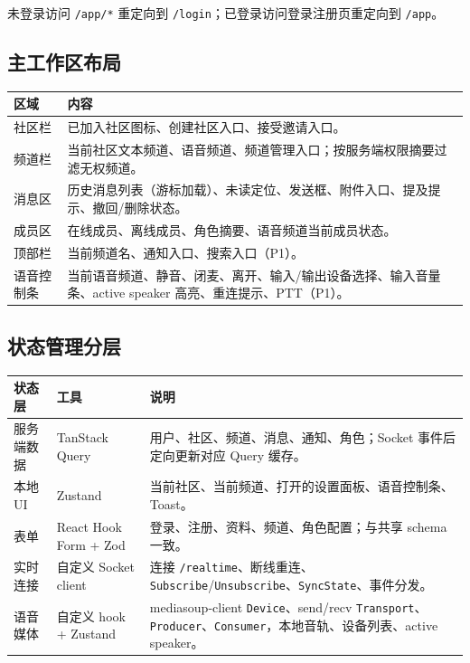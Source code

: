 未登录访问 \texttt{/app/*} 重定向到 \texttt{/login}；已登录访问登录注册页重定向到 \texttt{/app}。

\subsection{主工作区布局}

\noindent\begin{tabularx}{\textwidth}{L{2.8cm}Y}
  \toprule
  区域 & 内容 \\
  \midrule
  社区栏 & 已加入社区图标、创建社区入口、接受邀请入口。 \\
  频道栏 & 当前社区文本频道、语音频道、频道管理入口；按服务端权限摘要过滤无权频道。 \\
  消息区 & 历史消息列表（游标加载）、未读定位、发送框、附件入口、提及提示、撤回/删除状态。 \\
  成员区 & 在线成员、离线成员、角色摘要、语音频道当前成员状态。 \\
  顶部栏 & 当前频道名、通知入口、搜索入口（P1）。 \\
  语音控制条 & 当前语音频道、静音、闭麦、离开、输入/输出设备选择、输入音量条、active speaker 高亮、重连提示、PTT（P1）。 \\
  \bottomrule
\end{tabularx}

\subsection{状态管理分层}

\noindent\begin{tabularx}{\textwidth}{L{3.4cm}L{3cm}Y}
  \toprule
  状态层 & 工具 & 说明 \\
  \midrule
  服务端数据 & TanStack Query & 用户、社区、频道、消息、通知、角色；Socket 事件后定向更新对应 Query 缓存。 \\
  本地 UI & Zustand & 当前社区、当前频道、打开的设置面板、语音控制条、Toast。 \\
  表单 & React Hook Form + Zod & 登录、注册、资料、频道、角色配置；与共享 schema 一致。 \\
  实时连接 & 自定义 Socket client & 连接 \texttt{/realtime}、断线重连、\texttt{Subscribe}/\texttt{Unsubscribe}、\texttt{SyncState}、事件分发。 \\
  语音媒体 & 自定义 hook + Zustand & mediasoup-client \texttt{Device}、send/recv \texttt{Transport}、\texttt{Producer}、\texttt{Consumer}，本地音轨、设备列表、active speaker。 \\
  \bottomrule
\end{tabularx}

